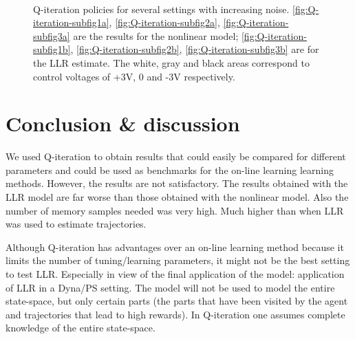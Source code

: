 \begin{figure}[ht]
{	\label{fig:Q-iteration-subfig2b}
	}
	\\
	\caption[Q-iteration results]{Q-iteration policies for several settings with increasing noise. \ref{fig:Q-iteration-subfig1a}, \ref{fig:Q-iteration-subfig2a}, \ref{fig:Q-iteration-subfig3a} are the results for the nonlinear model; \ref{fig:Q-iteration-subfig1b}, \ref{fig:Q-iteration-subfig2b}, \ref{fig:Q-iteration-subfig3b} are for the \ac{LLR} estimate. The white, gray and black areas correspond to control voltages of +3V, 0 and -3V respectively.}
	\label{fig:Q-iteration-results}
\end{figure}

\section{Conclusion \& discussion}
We used Q-iteration to obtain results that could easily be compared for different parameters and could be used as benchmarks for the on-line learning learning methods. However, the results are not satisfactory. The results obtained with the \ac{LLR} model are far worse than those obtained with the nonlinear model. Also the number of memory samples needed was very high. Much higher than when \ac{LLR} was used to estimate trajectories.

Although Q-iteration has advantages over an on-line learning method because it limits the number of tuning/learning parameters, it might not be the best setting to test \ac{LLR}. Especially in view of the final application of the model: application of \ac{LLR} in a Dyna/\ac{PS} setting. The model will not be used to model the entire state-space, but only certain parts (the parts that have been visited by the agent and trajectories that lead to high rewards). In Q-iteration one assumes complete knowledge of the entire state-space.


